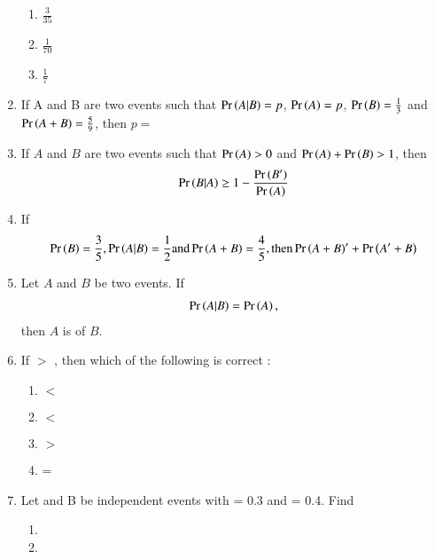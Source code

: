 \begin{enumerate}[label=\thesubsection.\arabic*,ref=\thesubsection.\theenumi]
\begin{enumerate}
    \item $\frac{3}{35}$
    \item $\frac{1}{70}$
    \item $\frac{1}{7}$
\end{enumerate}
\solution

\item If A and B are two events such that $\Pr\left(A|B\right)=p$, $\Pr\left(A\right)=p$, $\Pr\left(B\right)=\frac{1}{3}$ and $\Pr\left(A+B\right)=\frac{5}{9}$, then $p=$\\
\solution

\item If $A$ and $B$ are two events such that $\Pr\left(A\right) > 0$ and $\Pr\left(A\right) + \Pr\left(B\right) > 1$, then 
\begin{align}
    \pr{B | A} \geq 1 - \frac{\pr{B^\prime}}{\pr{A}}
	\label{eq:12/13/3/102/final}
\end{align}
\solution

\item If 
\begin{align}
\Pr\left(B\right) = \frac{3}{5},
\Pr\left(A|B\right) = \frac{1}{2} \text{and}
\Pr\left(A + B\right) = \frac{4}{5}, \text{then}
\Pr\left(A + B\right)^{\prime} + \Pr\left(A^{\prime} + B\right)
\end{align}
\solution
%
\item Let $A$ and $B$ be two events. If 
\begin{align}
\Pr\left(A|B\right) = \Pr\left(A\right),
\end{align} 
then $A$ is of $B$.\\
\solution
%
\item

 If  $>$ , then which of the following is correct :

\begin{enumerate}[label=(\Alph*)]

 \item  
 \label{12.13.6.18.A}
  $<$ \\
 \item 
  \label{12.13.6.18.B}
  $<$ \\
 \item 
 \label{12.13.6.18.C}
  $>$ \\
 \item 
  \label{12.13.6.18.D}
  = \\

 \end{enumerate}
%
\item Let  and B be independent events with  = 0.3 and  = 0.4. Find 
\begin{enumerate}
\item {} \item {}


\end{enumerate}
\end{enumerate}
